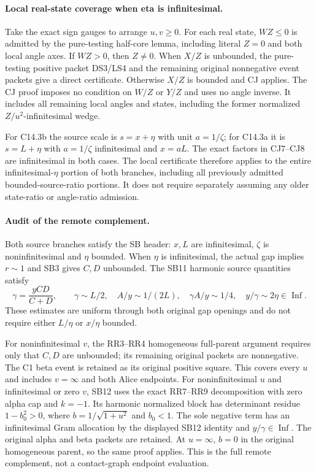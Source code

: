 \paragraph{Local real-state coverage when eta is infinitesimal.}
Take the exact sign gauges to arrange $u,v\ge0$.  For each real
state, $WZ\le0$ is admitted by the pure-testing half-core lemma,
including literal $Z=0$ and both local angle axes.  If $WZ>0$, then
$Z\ne0$.  When $X/Z$ is unbounded, the pure-testing positive packet
DS3/LS4 and the remaining original nonnegative event packets give a
direct certificate.  Otherwise $X/Z$ is bounded and CJ applies.
The CJ proof imposes no condition on $W/Z$ or $Y/Z$ and uses no
angle inverse.  It includes all remaining local angles and states,
including the former normalized $Z/u^2$-infinitesimal wedge.

For C14.3b the source scale is $s=x+\eta$ with unit $a=1/\zeta$;
for C14.3a it is $s=L+\eta$ with $a=1/\zeta$ infinitesimal and
$x=aL$.  The exact factors in CJ7--CJ8 are infinitesimal in both
cases.  The local certificate therefore applies to the entire
infinitesimal-$\eta$ portion of both branches, including all
previously admitted bounded-source-ratio portions.  It does not
require separately assuming any older state-ratio or angle-ratio
admission.

\paragraph{Audit of the remote complement.}
Both source branches satisfy the SB header: $x,L$ are infinitesimal,
$\zeta$ is noninfinitesimal and $\eta$ bounded.  When $\eta$ is
infinitesimal, the actual gap implies $r\sim1$ and SB3 gives
$C,D$ unbounded.  The SB11 harmonic source quantities satisfy
\[
 \gamma=\frac{yCD}{C+D},\qquad
 \gamma\sim L/2,\quad A/y\sim1/(2L),\quad
 \gamma A/y\sim1/4,\quad y/\gamma\sim2\eta\in\operatorname{Inf}.
\]
These estimates are uniform through both original gap openings and
do not require either $L/\eta$ or $x/\eta$ bounded.

For noninfinitesimal $v$, the RR3--RR4 homogeneous full-parent
argument requires only that $C,D$ are unbounded; its remaining
original packets are nonnegative.  The C1 beta event is retained
as its original positive square.  This covers every $u$ and includes
$v=\infty$ and both Alice endpoints.  For noninfinitesimal $u$ and
infinitesimal or zero $v$, SB12 uses the exact RR7--RR9 decomposition
with zero alpha cap and $k=-1$.  Its harmonic normalized block has
determinant residue $1-b_0^2>0$, where
$b=1/\sqrt{1+u^2}$ and $b_0<1$.  The sole negative term has an
infinitesimal Gram allocation by the displayed SB12 identity and
$y/\gamma\in\operatorname{Inf}$.  The original alpha and beta
packets are retained.  At $u=\infty$, $b=0$ in the original
homogeneous parent, so the same proof applies.  This is the full
remote complement, not a contact-graph endpoint evaluation.

